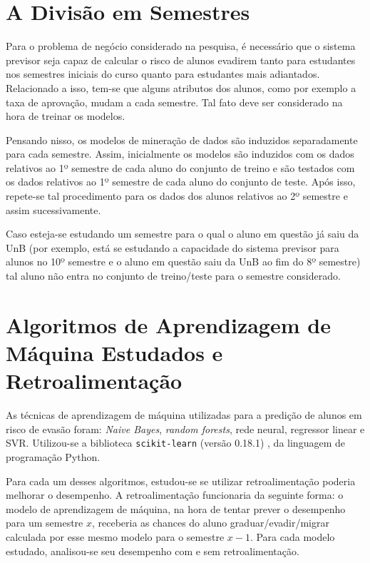 \section{A Divisão em Semestres}
Para o problema de negócio considerado na pesquisa, é necessário que o sistema
previsor seja capaz de calcular o risco de alunos evadirem tanto para estudantes nos
semestres iniciais do curso quanto para estudantes mais adiantados. Relacionado a
isso, tem-se que alguns atributos dos alunos, como por exemplo a taxa de aprovação,
mudam a cada semestre. Tal fato deve ser considerado na hora de treinar os modelos. 
\par Pensando nisso, os modelos de mineração de dados são induzidos
separadamente para cada semestre. Assim, inicialmente os modelos são induzidos com os
dados relativos ao 1º semestre de cada aluno do conjunto de treino e são
testados com os dados relativos ao 1º semestre de cada aluno do conjunto de
teste. Após isso, repete-se tal procedimento para os dados dos alunos relativos ao
2º semestre e assim sucessivamente. 
\par Caso esteja-se estudando um semestre para o
qual o aluno em questão já saiu da UnB (por exemplo, está se estudando a capacidade
do sistema previsor para alunos no 10º semestre e o aluno em questão saiu da UnB ao
fim do 8º semestre) tal aluno não entra no conjunto de treino/teste para o semestre
considerado.   

\section{Algoritmos de Aprendizagem de Máquina Estudados e Retroalimentação} 
As técnicas de aprendizagem de máquina utilizadas para a predição de alunos em risco
de evasão foram: \textit{Naive Bayes}, \textit{random forests}, rede neural, regressor linear e
SVR. Utilizou-se a biblioteca \texttt{scikit-learn} (versão 0.18.1) \cite{sklearn}, da
linguagem de programação Python.
\par Para cada um desses algoritmos, estudou-se se
utilizar retroalimentação poderia melhorar o desempenho. A retroalimentação
funcionaria da seguinte forma: o modelo de aprendizagem de máquina, na hora de tentar
prever o desempenho para um semestre $x$, receberia as chances do aluno
graduar/evadir/migrar calculada por esse mesmo modelo para o semestre $x-1$.
Para cada modelo estudado, analisou-se seu desempenho com e sem
retroalimentação. 

